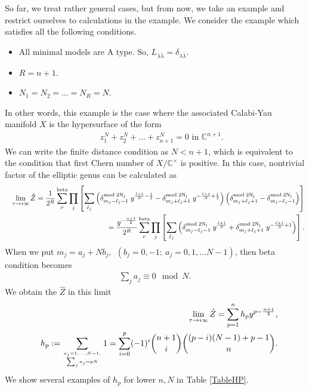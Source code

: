 \documentclass[a4paper,12pt]{article}
\numberwithin{equation}{section}
\newcommand{\Cb}{{\mathbb C}}
\newcommand{\Cx}{{\mathbb C}^{\times}}
\newcommand{\deltam}[2]{\delta^{\rm mod\;#2}_{#1}}
\newcommand{\lambdab}{\bar{\lambda}}
\newcommand{\Zh}{\hat{Z}}
\renewcommand{\atop}[2]{%
\genfrac{}{}{0pt}{}{#1}{#2}}
\begin{document}
So far, we treat rather general cases, but from now, 
we take an example and restrict ourselves to calculations in the example.
We consider the example which satisfies all the following conditions.
\begin{itemize}
 \item All minimal models are A type. 
So, $L_{\lambda\lambdab}=\delta_{\lambda\lambdab}$.
 \item $R=n+1$.
 \item $N_1=N_2=\dots=N_R=N$.
\end{itemize}
In other words, this example is 
the case where the associated Calabi-Yau manifold $X$ is
 the hypersurface of the form
\begin{eqnarray}
 && z_1^N+z_2^N+\dots+z_{n+1}^N=0 \mbox{ in } \Cb^{n+1}.
\label{BaseEquation}
\end{eqnarray}
We can write the finite distance condition as
$N<n+1$, which is equivalent to the condition that 
first Chern number of $X/\Cx$ is positive.
In this case, nontrivial factor of the elliptic genus
can be calculated as
\begin{eqnarray*}
&& \lim_{\tau\to i \infty}\Zh=\frac1{2^R}
\sum_{\nu}^{\rm beta}\prod_j \left[
\sum_{\ell_j}
\left(\deltam{m_j-\ell_j-1}{2N_j}\;y^{\frac{\ell+1}{N}-\frac12}
-\deltam{m_j+\ell_j+1}{2N_j}\;y^{-\frac{\ell+1}{N}+\frac12}\right)
\left(\deltam{m_j+\ell_j+1}{2N_j}-\deltam{m_j-\ell_j-1}{2N_j}\right)
\right]\\
&& \hspace{1.5cm}=
\frac{y^{-\frac{n+1}{2}}}{2^R}
\sum_{\nu}^{\rm beta}\prod_j \left[
\sum_{\ell_j}
\left(\deltam{m_j-\ell_j-1}{2N_j}\;y^{\frac{\ell+1}{N}}
+\deltam{m_j+\ell_j+1}{2N_j}\;y^{-\frac{\ell+1}{N}+1}\right)
\right].
\end{eqnarray*}
When we put $m_j=a_j+Nb_j,\ \ (b_j=0,-1;\ a_j=0,1,\dots N-1)$, then 
beta condition becomes
\begin{eqnarray*}
 \sum_j a_j\equiv 0 \mod N.
\end{eqnarray*}
We obtain the $\Zh$ in this limit
\begin{eqnarray*}
 &&\lim_{\tau\to i \infty}\Zh=\sum_{p=1}^{n}h_p y^{p-\frac{n+1}{2}},\\
 && h_p:=\sum_{
\atop{a_j=1,\dots,N-1,}{\sum_ja_j=pN}
}1=\sum_{i=0}^p(-1)^i\binom{n+1}{i}\binom{(p-i)(N-1)+p-1}{n}.
\end{eqnarray*}
We show several examples of $h_p$ for lower $n,N$ in Table \ref{TableHP}.
\end{document}
